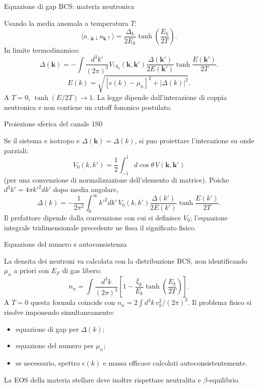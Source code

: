 \begin{frame}[t]{Equazione di gap BCS: materia neutronica}
\vspace*{3mm}
\small

Usando la media anomala a temperatura $T$:
\[
\langle a_{-\mathbf k\downarrow}a_{\mathbf k\uparrow}\rangle
=\frac{\Delta_k}{2E_k}\tanh\left(\frac{E_k}{2T}\right).
\]
In limite termodinamico:
\[
\boxed{\Delta(\mathbf k)=-\int\frac{d^3k'}{(2\pi)^3}
V_{{}^1S_0}(\mathbf k,\mathbf k')
\frac{\Delta(\mathbf k')}{2E(\mathbf k')}
\tanh\frac{E(\mathbf k')}{2T}.}
\]
\[
E(k)=\sqrt{[\epsilon(k)-\mu_n]^2+|\Delta(k)|^2}.
\]
A $T=0$, $\tanh(E/2T)\to1$. La legge dipende dall'interazione di coppia neutronica e non contiene un cutoff fononico postulato.
\end{frame}

\begin{frame}[t]{Proiezione sferica del canale 1S0}
\vspace*{3mm}
\small

Se il sistema e isotropo e $\Delta(\mathbf k)=\Delta(k)$, si puo proiettare l'interazione su onde parziali:
\[
V_0(k,k')=\frac12\int_{-1}^{1}d\cos\theta\,
V(\mathbf k,\mathbf k')
\]
(per una convenzione di normalizzazione dell'elemento di matrice).
Poiche $d^3k'=4\pi k'^2dk'$ dopo media angolare,
\[
\boxed{\Delta(k)=-\frac1{2\pi^2}\int_0^\infty
k'^2dk'\,V_0(k,k')\frac{\Delta(k')}{2E(k')}
\tanh\frac{E(k')}{2T}.}
\]
Il prefattore dipende dalla convenzione con cui si definisce $V_0$; l'equazione integrale tridimensionale precedente ne fissa il significato fisico.
\end{frame}

\begin{frame}[t]{Equazione del numero e autoconsistenza}
\vspace*{3mm}
\small

La densita dei neutroni va calcolata con la distribuzione BCS, non identificando $\mu_n$ a priori con $E_F$ di gas libero:
\[
\boxed{n_n=\int\frac{d^3k}{(2\pi)^3}
\left[1-\frac{\xi_k}{E_k}\tanh\left(\frac{E_k}{2T}\right)\right].}
\]
A $T=0$ questa formula coincide con $n_n=2\int d^3k\,v_k^2/(2\pi)^3$.
Il problema fisico si risolve imponendo simultaneamente:
\begin{itemize}
\item equazione di gap per $\Delta(k)$;
\item equazione del numero per $\mu_n$;
\item se necessario, spettro $\epsilon(k)$ e massa efficace calcolati autoconsistentemente.
\end{itemize}
La EOS della materia stellare deve inoltre rispettare neutralita e $\beta$-equilibrio.
\end{frame}

